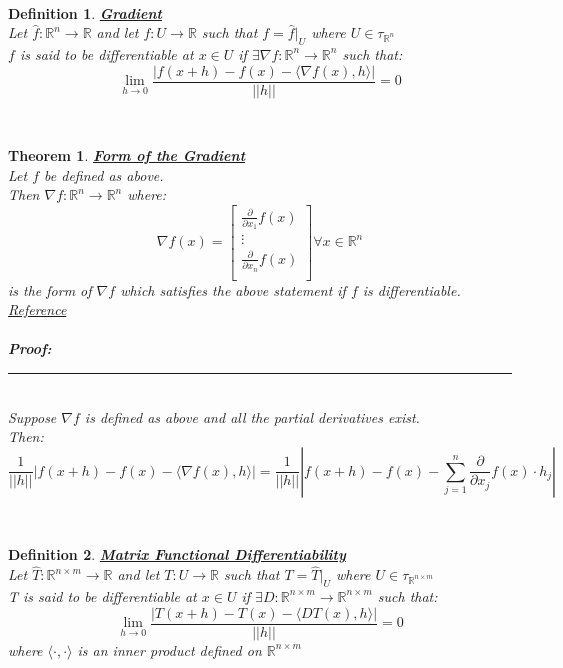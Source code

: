 \documentclass[12pt]{extarticle}
\theoremstyle{plain}
\newtheorem{thm}{Theorem}[section]
\theoremstyle{plain}
\theoremstyle{plain}
\theoremstyle{Definition}
\newtheorem{def.}{Definition}[section]
\theoremstyle{Definition}
\theoremstyle{plain}
\theoremstyle{plain}
\newcommand{\cut}[0]{\noindent\framebox[\linewidth]{\rule{\linewidth}{2pt}}\\}
\newcommand{\prof}[0]{	\noindent \textbf{Proof:} \rule{500pt}{2pt} \\ }
\begin{document}
\cut
\begin{def.} \underline{\textbf{Gradient}} \\ 
	Let $\hat{f} : \mathbb{R}^n \to \mathbb{R}$ and let $f : U \to \mathbb{R}$ such that $f = \hat{f}|_U$ where $U \in \tau_{\mathbb{R}^n}$ \\ 
	$f$ is said to be differentiable at $x \in U$ if $\exists \nabla f : \mathbb{R}^n \to \mathbb{R}^n$ such that: \\  	
	$$\lim_{h \to 0}\frac{|f(x + h) - f(x) - \langle \nabla f(x),h \rangle|}{||h||} = 0$$ 
\end{def.} 
\cut
\begin{thm} \underline{\textbf{Form of the Gradient}} \\ 
	Let $f$ be defined as above. \\ 
	Then $\nabla f: \mathbb{R}^n \to \mathbb{R}^n$ where: \\ 
	\[
	\nabla f(x) = 
	\begin{bmatrix}
	\frac{\partial }{\partial x_1}f(x) \\ 
	\vdots \\
	\frac{\partial }{\partial x_n}f(x) \\ 				
	\end{bmatrix}
	\forall x \in \mathbb{R}^n
	\]
	is the form of $\nabla f$ which satisfies the above statement if $f$ is differentiable. \\
	\href{https://en.wikipedia.org/wiki/Gradient}{Reference} \\ \\
	\prof 
	Suppose $\nabla f$ is defined as above and all the partial derivatives exist. \\ 
	Then: 
	$$\frac{1}{||h||} |f(x + h) - f(x) - \langle \nabla f(x),h \rangle| = \frac{1}{||h||} \left|f(x + h) - f(x) - \sum_{j=1}^n \frac{\partial}{\partial x_j} f(x)\cdot h_j\right|$$
\end{thm}
\cut
\begin{def.} \underline{\textbf{Matrix Functional Differentiability}} \\ 
	Let $\hat{T} : \mathbb{R}^{n \times m} \to \mathbb{R}$ and let $T : U \to \mathbb{R}$ such that $T = \hat{T}|_U$ where $U \in \tau_{\mathbb{R}^{n \times m}}$ \\ 
	T is said to be differentiable at $x \in U$ if $\exists D : \mathbb{R}^{n \times m} \to \mathbb{R}^{n \times m}$ such that: \\  
	$$\lim_{h \to 0}\frac{|T(x + h) - T(x) - \langle D T(x),h \rangle|}{||h||} = 0$$
	where $\langle \cdot, \cdot \rangle$ is an inner product defined on $\mathbb{R}^{n \times m}$
\end{def.}
\end{document}

